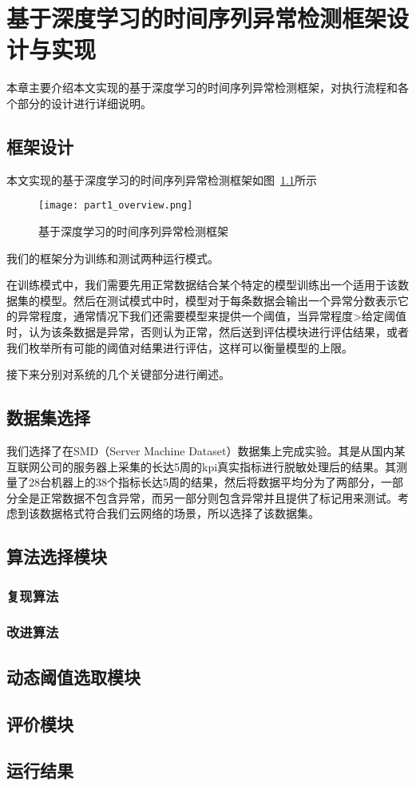 
\chapter{基于深度学习的时间序列异常检测框架设计与实现}
\label{cha:intro}
本章主要介绍本文实现的基于深度学习的时间序列异常检测框架，对执行流程和各个部分的设计进行详细说明。
\section{框架设计}
本文实现的基于深度学习的时间序列异常检测框架如图~\ref{fig:part1_overview}所示

\begin{figure}[H]
    \centering
    \texttt{[image: part1\_overview.png]}
    \caption{基于深度学习的时间序列异常检测框架}
    \label{fig:part1_overview}
  \end{figure}

我们的框架分为训练和测试两种运行模式。

在训练模式中，我们需要先用正常数据结合某个特定的模型训练出一个适用于该数据集的模型。然后在测试模式中时，模型对于每条数据会输出一个异常分数表示它的异常程度，通常情况下我们还需要模型来提供一个阈值，当异常程度>给定阈值时，认为该条数据是异常，否则认为正常，然后送到评估模块进行评估结果，或者我们枚举所有可能的阈值对结果进行评估，这样可以衡量模型的上限。

接下来分别对系统的几个关键部分进行阐述。

\section{数据集选择}
我们选择了在SMD（Server Machine Dataset）\cite{su2019robust}数据集上完成实验。其是从国内某互联网公司的服务器上采集的长达5周的kpi真实指标进行脱敏处理后的结果。其测量了28台机器上的38个指标长达5周的结果，然后将数据平均分为了两部分，一部分全是正常数据不包含异常，而另一部分则包含异常并且提供了标记用来测试。考虑到该数据格式符合我们云网络的场景，所以选择了该数据集。

\section{算法选择模块}
\subsection{复现算法}
\subsection{改进算法}
\section{动态阈值选取模块}
\section{评价模块}
\section{运行结果}


